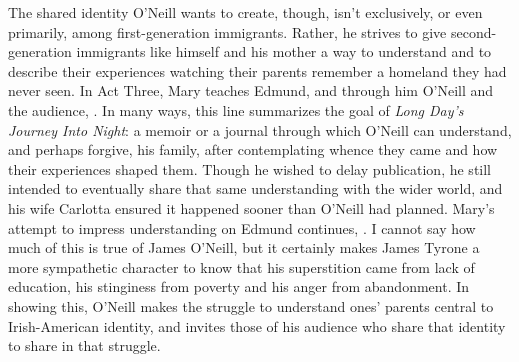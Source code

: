 \documentclass[letterpaper, 12pt]{article}
\newcommand{\ldjin}{\textit{Long Day's Journey Into Night}}
\newcommand{\oneill}{O'Neill}
\begin{document}
The shared identity \oneill{} wants to create, though, isn't exclusively, or
even primarily, among first-generation immigrants. Rather, he strives to give
second-generation immigrants like himself and his mother a way to understand
and to describe their experiences watching their parents remember a homeland
they had never seen. In Act Three, Mary teaches Edmund, and through him
\oneill{} and the audience, . In many ways, this line summarizes the goal of \ldjin{}:
a memoir or a journal through which \oneill{} can understand, and perhaps
forgive, his family, after contemplating whence they came and how their
experiences shaped them. Though he wished to delay publication, he still
intended to eventually share that same understanding with the wider world, and
his wife Carlotta ensured it happened sooner than \oneill{} had planned. Mary's
attempt to impress understanding on Edmund continues,
. I cannot say how much of this is true of James
\oneill{}, but it certainly makes James Tyrone a more sympathetic character to
know that his superstition came from lack of education, his stinginess from
poverty and his anger from abandonment. In showing this, \oneill{} makes the
struggle to understand ones' parents central to Irish-American identity, and
invites those of his audience who share that identity to share in that
struggle.

\printbibliography{}
\end{document}
